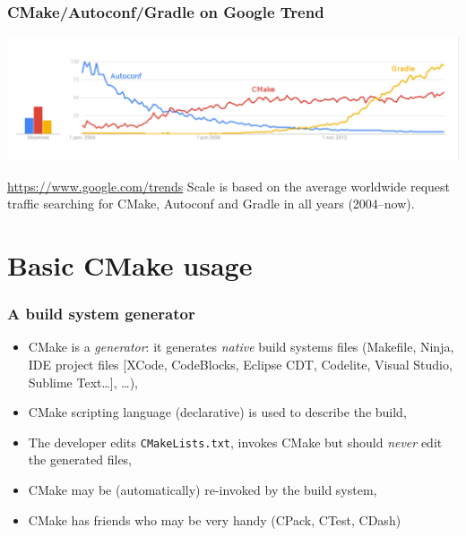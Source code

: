 \documentclass[compress,slidestop,table,usepdftitle=false
              ]
               {beamer}
\newcommand{\fname}[1]{\texttt{#1}}
\begin{document}
\begin{frame}
\frametitle{CMake/Autoconf/Gradle on Google Trend}
\begin{center}
\includegraphics[width=1.0\textwidth,height=0.50\textheight]{CMakeAutoconfGradle-trend-2016}
\end{center}
\begin{block}{\url{https://www.google.com/trends}}
Scale is based on the average worldwide request traffic searching for CMake, Autoconf and Gradle in all years (2004--now).
\end{block}
\end{frame}

\section{Basic CMake usage}

\begin{frame}
\frametitle{A build system generator}
\begin{itemize}
\item CMake is a \emph{generator}: it generates \emph{native} build systems files (Makefile, Ninja, IDE project files [XCode, CodeBlocks, Eclipse CDT, Codelite, Visual Studio, Sublime Text\ldots], \ldots),
\item CMake scripting language (declarative) is used to describe the build,
\item The developer edits \fname{CMakeLists.txt}, invokes CMake but
      should \emph{never} edit the generated files,
\item CMake may be (automatically) re-invoked by the build system,
\item CMake has friends who may be very handy (CPack, CTest, CDash)
\end{itemize}
\end{frame}
\end{document}

